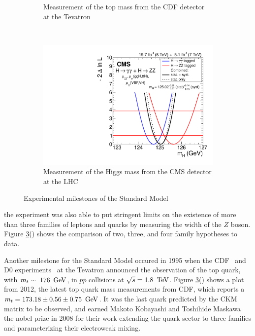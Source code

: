 \begin{figure}
\begin{subfigure}[h]{0.3\textwidth}
     \caption{Measurement of the top mass from the CDF detector at the Tevatron} \label{fig:topMass_CDF}
   \end{subfigure}
   ~ %
   \begin{subfigure}[h]{0.3\textwidth}
     \includegraphics[width=\textwidth]{Figures/Experimental_Results/CMS_higgsMass_scan_1d_all.pdf}
     \caption{Measurement of the Higgs mass from the CMS detector at the LHC} \label{fig:topMass_CDF}
   \end{subfigure}
   \caption{Experimental milestones of the Standard Model}\label{fig:ex_milestones_sm}
\end{figure}

\noindent the experiment was also able to put stringent limits on the
existence of more than three families of leptons and quarks by
measuring the width of the $Z$ boson.  Figure
\ref{fig:ex_milestones_sm}() shows the
comparison of two, three, and four family hypotheses to data.   

\par Another milestone for the Standard Model occured in 1995 when the
CDF~\cite{ex:CDF_topQuark} and D0 experiments~\cite{ex:D0_topQuark} at
the Tevatron announced the observation of the top quark, with
$m_{t}\sim~176~\,\text{Ge\hspace{-.08em}V}$, in $p\bar{p}$ collisions at $\sqrt{s}=1.8~\,\text{Te\hspace{-.08em}V}$.
Figure \ref{fig:ex_milestones_sm}() shows a
plot from 2012, the latest top quark mass measurements from CDF, which
reports a $m_{t} = 173.18 \pm 0.56 \pm 0.75~\,\text{Ge\hspace{-.08em}V}$. It was the last
quark predicted by the CKM matrix to be observed, and earned Makoto
Kobayashi and Toshihide Maskawa the nobel prize in 2008 for their work
extending the quark sector to three families and parameterizing their
electroweak mixing.    

